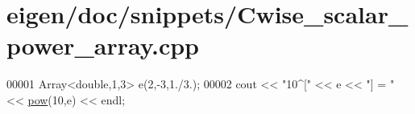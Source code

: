 \hypertarget{eigen_2doc_2snippets_2_cwise__scalar__power__array_8cpp_source}{}\section{eigen/doc/snippets/\+Cwise\+\_\+scalar\+\_\+power\+\_\+array.cpp}
\label{eigen_2doc_2snippets_2_cwise__scalar__power__array_8cpp_source}

\begin{DoxyCode}
00001 Array<double,1,3> e(2,-3,1./3.);
00002 cout << \textcolor{stringliteral}{"10^["} << e << \textcolor{stringliteral}{"] = "} << \hyperlink{group___core___module_ab6dc101d82e8228a19a8840e3a29c1c9}{pow}(10,e) << endl;
\end{DoxyCode}
